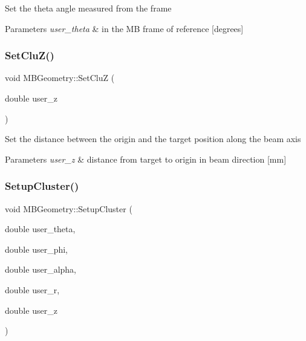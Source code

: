 Set the theta angle measured from the frame 
\begin{DoxyParams}{Parameters}
{\em user\+\_\+theta} & in the MB frame of reference \mbox{[}degrees\mbox{]} \\
\hline
\end{DoxyParams}
\mbox{\label{class_m_b_geometry_aa6b9d54c7157e8c65e2b208fcef8222c}} 
\subsubsection{\texorpdfstring{Set\+Clu\+Z()}{SetCluZ()}}
{\footnotesize\ttfamily void M\+B\+Geometry\+::\+Set\+CluZ (\begin{DoxyParamCaption}\item[{double}]{user\+\_\+z }\end{DoxyParamCaption})}

Set the distance between the origin and the target position along the beam axis 
\begin{DoxyParams}{Parameters}
{\em user\+\_\+z} & distance from target to origin in beam direction \mbox{[}mm\mbox{]} \\
\hline
\end{DoxyParams}
\mbox{\label{class_m_b_geometry_ac3751c8eb94c051b402c30cb14cba462}} 
\subsubsection{\texorpdfstring{Setup\+Cluster()}{SetupCluster()}}
{\footnotesize\ttfamily void M\+B\+Geometry\+::\+Setup\+Cluster (\begin{DoxyParamCaption}\item[{double}]{user\+\_\+theta,  }\item[{double}]{user\+\_\+phi,  }\item[{double}]{user\+\_\+alpha,  }\item[{double}]{user\+\_\+r,  }\item[{double}]{user\+\_\+z }\end{DoxyParamCaption})}

